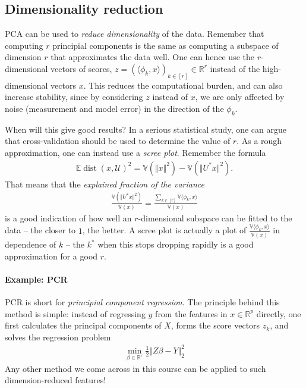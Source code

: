 \documentclass{article}
\newcommand{\erw}{\mathbb{E}} %
\newcommand{\sprod}[1]{\langle #1 \rangle}
\newcommand{\calU}{\mathcal{U}}
\newcommand{\R}{\mathbb{R}}
\newcommand{\norm}[1]{\Vert #1 \Vert}
\DeclareMathOperator{\dist}{dist}
\begin{document}
\subsection{Dimensionality reduction} PCA can be used to \emph{reduce dimensionality} of the data. Remember that computing $r$ principial components is the same as computing a subspace of dimension $r$ that approximates the data well. One can hence use the $r$-dimensional vectors of scores, $z = (\sprod{\phi_k,x})_{k \in [r]} \in \R^r$ instead of the high-dimensional vectors $x$. This reduces the computational burden, and can also increase stability, since by considering $z$ instead of $x$, we are only affected by noise (measurement and model error) in the direction of the $\phi_k$. 

When will this give good results? In a serious statistical study, one can argue that cross-validation should be used to determine the value of $r$. As a rough approximation, one can instead use a \emph{scree plot}. Remember the formula
\begin{align*}
    \erw{\dist(x,\calU)^2} = \mathbb{V}(\norm{x}^2) - \mathbb{V}(\norm{U^*x}^2).
\end{align*}
That means that the \emph{explained fraction of the variance}
\begin{align*}
    \frac{\mathbb{V}(\norm{U^*x}^2)}{\mathbb{V}(x)} = \frac{\sum_{k\in [r]}\mathbb{V}\sprod{\phi_k,x}}{\mathbb{V}(x)}
\end{align*}
is a good indication of how well an $r$-dimensional subspace can be fitted to the data -- the closer to $1$, the better. A scree plot is actually a plot of $\frac{\mathbb{V}\sprod{\phi_k,x}}{\mathbb{V}(x)}$ in dependence of $k$ -- the $k^*$ when this stops dropping rapidly is a good approximation for a good $r$.

\paragraph{Example: PCR} PCR is short for \emph{principial component regression}. The principle behind this method is simple: instead of regressing $y$ from the features in $x \in \R^p$ directly, one first calculates the principal components of $X$, forms the score vectors $z_k$, and solves the regression problem
\begin{align*}
    \min_{\beta\in \R^r} \tfrac{1}{2}\norm{Z\beta - Y}_2^2
\end{align*}
Any other method we come across in this course can be applied to such dimension-reduced features!
\end{document}
